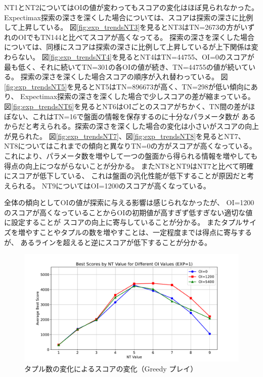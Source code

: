 NT1とNT2についてはOIの値が変わってもスコアの変化はほぼ見られなかった。
Expectimax探索の深さを深くした場合については、スコアは探索の深さに比例して上昇している。
図\ref{fig:exp_trendsNT3}を見るとNT3はTN=2673の方がいずれのOIでもTN144と比べてスコアが高くなってる。
探索の深さを深くした場合については、同様にスコアは探索の深さに比例して上昇しているが上下関係は変わらない。
図\ref{fig:exp_trendsNT4}を見るとNT4はTN=44755、OI=0のスコアが最も低く、それに続いてTN=301の各OIの値が続き、TN=44755の値が続いている。
探索の深さを深くした場合スコアの順序が入れ替わっている。
図\ref{fig:exp_trendsNT5}を見るとNT5はTN=896673が高く、TN=298が低い傾向にあり、
Expectimax探索の深さを深くした場合で少しスコアの差が縮まっている。
図\ref{fig:exp_trendsNT6}を見るとNT6はOIごとのスコアがちかく、TN間の差がほぼない、これはTN=16で盤面の情報を保存するのに十分なパラメータ数が
あるからだと考えられる。探索の深さを深くした場合の変化は小さいがスコアの向上が見られた。
図\ref{fig:exp_trendsNT7}、図\ref{fig:exp_trendsNT8}を見るとNT7、NT8についてはこれまでの傾向と異なりTN=0の方がスコアが高くなっている。
これにより、パラメータ数を増やして一つの盤面から得られる情報を増やしても
得点の向上につながらないことが分かる。
またNT8とNT9はNT7と比べて明確にスコアが低下している、
これは盤面の汎化性能が低下することが原因だと考えられる。
NT9についてはOI=1200のスコアが高くなっている。

全体の傾向としてOIの値が探索に与える影響は感じられなかったが、
OI=1200のスコアが高くなっていることからOIの初期値が高すぎず低すぎない適切な値に設定することが
スコアの向上に寄与していることが分かる。
またタプルサイズを増やすことやタプルの数を増やすことは、一定程度までは得点に寄与するが、
あるラインを超えると逆にスコアが低下することが分かる。
\begin{figure}[t]
    \centering
    \includegraphics[width=\linewidth]{pdf/best_tn_scores_exp1.pdf}
    \caption{タプル数の変化によるスコアの変化（Greedy プレイ）}
    \label{fig:score_vs_tuple_greedy}
\end{figure}

